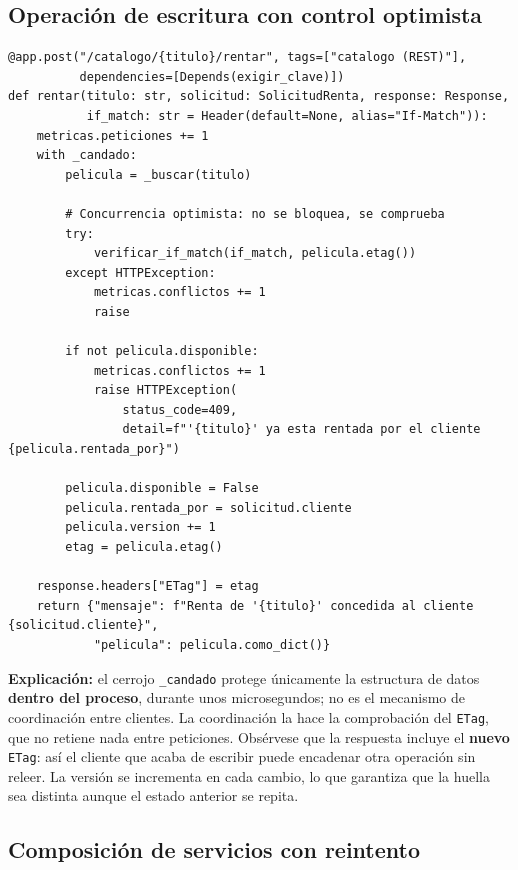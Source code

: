 \documentclass[12pt]{article}
\begin{document}
\subsection{Operación de escritura con control optimista}

\begin{lstlisting}[caption={Renta de una película (catalogo.py)}]
@app.post("/catalogo/{titulo}/rentar", tags=["catalogo (REST)"],
          dependencies=[Depends(exigir_clave)])
def rentar(titulo: str, solicitud: SolicitudRenta, response: Response,
           if_match: str = Header(default=None, alias="If-Match")):
    metricas.peticiones += 1
    with _candado:
        pelicula = _buscar(titulo)

        # Concurrencia optimista: no se bloquea, se comprueba
        try:
            verificar_if_match(if_match, pelicula.etag())
        except HTTPException:
            metricas.conflictos += 1
            raise

        if not pelicula.disponible:
            metricas.conflictos += 1
            raise HTTPException(
                status_code=409,
                detail=f"'{titulo}' ya esta rentada por el cliente {pelicula.rentada_por}")

        pelicula.disponible = False
        pelicula.rentada_por = solicitud.cliente
        pelicula.version += 1
        etag = pelicula.etag()

    response.headers["ETag"] = etag
    return {"mensaje": f"Renta de '{titulo}' concedida al cliente {solicitud.cliente}",
            "pelicula": pelicula.como_dict()}
\end{lstlisting}

\noindent\textbf{Explicación:} el cerrojo \texttt{\_candado} protege únicamente la estructura de datos \textbf{dentro del proceso}, durante unos microsegundos; no es el mecanismo de coordinación entre clientes. La coordinación la hace la comprobación del \texttt{ETag}, que no retiene nada entre peticiones. Obsérvese que la respuesta incluye el \textbf{nuevo} \texttt{ETag}: así el cliente que acaba de escribir puede encadenar otra operación sin releer. La versión se incrementa en cada cambio, lo que garantiza que la huella sea distinta aunque el estado anterior se repita.

\subsection{Composición de servicios con reintento}
\end{document}
